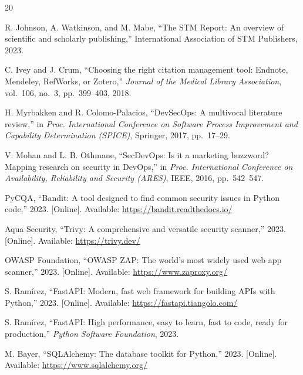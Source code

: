 \documentclass[conference]{IEEEtran}
\begin{document}
\balance
\begin{thebibliography}{20}

R. Johnson, A. Watkinson, and M. Mabe, ``The STM Report: An overview of scientific and scholarly publishing,'' International Association of STM Publishers, 2023.

C. Ivey and J. Crum, ``Choosing the right citation management tool: Endnote, Mendeley, RefWorks, or Zotero,'' \textit{Journal of the Medical Library Association}, vol.~106, no.~3, pp.~399--403, 2018.

H. Myrbakken and R. Colomo-Palacios, ``DevSecOps: A multivocal literature review,'' in \textit{Proc. International Conference on Software Process Improvement and Capability Determination (SPICE)}, Springer, 2017, pp.~17--29.

V. Mohan and L. B. Othmane, ``SecDevOps: Is it a marketing buzzword? Mapping research on security in DevOps,'' in \textit{Proc. International Conference on Availability, Reliability and Security (ARES)}, IEEE, 2016, pp.~542--547.

PyCQA, ``Bandit: A tool designed to find common security issues in Python code,'' 2023. [Online]. Available: \url{https://bandit.readthedocs.io/}

Aqua Security, ``Trivy: A comprehensive and versatile security scanner,'' 2023. [Online]. Available: \url{https://trivy.dev/}

OWASP Foundation, ``OWASP ZAP: The world's most widely used web app scanner,'' 2023. [Online]. Available: \url{https://www.zaproxy.org/}

S. Ram\'{i}rez, ``FastAPI: Modern, fast web framework for building APIs with Python,'' 2023. [Online]. Available: \url{https://fastapi.tiangolo.com/}

S. Ram\'{i}rez, ``FastAPI: High performance, easy to learn, fast to code, ready for production,'' \textit{Python Software Foundation}, 2023.

M. Bayer, ``SQLAlchemy: The database toolkit for Python,'' 2023. [Online]. Available: \url{https://www.sqlalchemy.org/}


\end{thebibliography}
\end{document}
